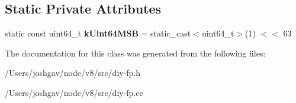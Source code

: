 \subsection*{Static Private Attributes}
\begin{DoxyCompactItemize}
\item 
static const uint64\+\_\+t {\bfseries k\+Uint64\+M\+SB} = static\+\_\+cast$<$uint64\+\_\+t$>$(1) $<$$<$ 63\hypertarget{classv8_1_1internal_1_1_diy_fp_a4972f9ab21090d926b71fe6b0c5d6154}{}\label{classv8_1_1internal_1_1_diy_fp_a4972f9ab21090d926b71fe6b0c5d6154}

\end{DoxyCompactItemize}


The documentation for this class was generated from the following files\+:\begin{DoxyCompactItemize}
\item 
/\+Users/joshgav/node/v8/src/diy-\/fp.\+h\item 
/\+Users/joshgav/node/v8/src/diy-\/fp.\+cc\end{DoxyCompactItemize}
